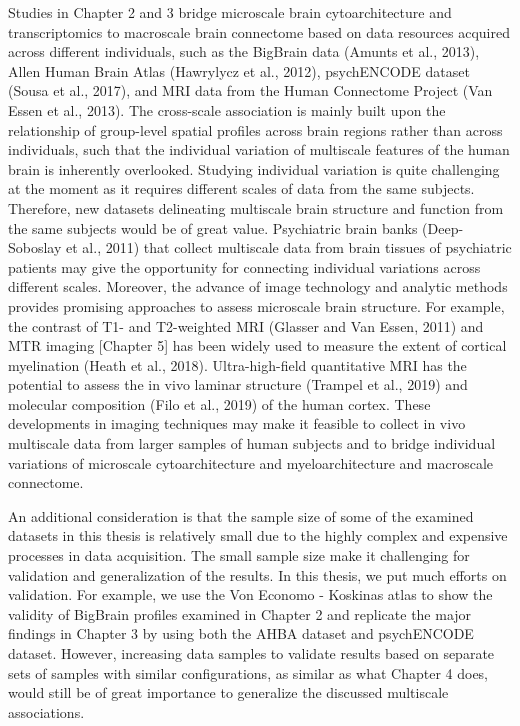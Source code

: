 \begin{refsection}
Studies in Chapter 2 and 3 bridge microscale brain cytoarchitecture and transcriptomics to macroscale brain connectome based on data resources acquired across different individuals, such as the BigBrain data (Amunts et al., 2013), Allen Human Brain Atlas (Hawrylycz et al., 2012), psychENCODE dataset (Sousa et al., 2017), and MRI data from the Human Connectome Project (Van Essen et al., 2013). The cross-scale association is mainly built upon the relationship of group-level spatial profiles across brain regions rather than across individuals, such that the individual variation of multiscale features of the human brain is inherently overlooked. Studying individual variation is quite challenging at the moment as it requires different scales of data from the same subjects. Therefore, new datasets delineating multiscale brain structure and function from the same subjects would be of great value. Psychiatric brain banks (Deep-Soboslay et al., 2011) that collect multiscale data from brain tissues of psychiatric patients may give the opportunity for connecting individual variations across different scales. Moreover, the advance of image technology and analytic methods provides promising approaches to assess microscale brain structure. For example, the contrast of T1- and T2-weighted MRI (Glasser and Van Essen, 2011) and MTR imaging [Chapter 5] has been widely used to measure the extent of cortical myelination (Heath et al., 2018). Ultra-high-field quantitative MRI has the potential to assess the in vivo laminar structure (Trampel et al., 2019) and molecular composition (Filo et al., 2019) of the human cortex. These developments in imaging techniques may make it feasible to collect in vivo multiscale data from larger samples of human subjects and to bridge individual variations of microscale cytoarchitecture and myeloarchitecture and macroscale connectome.

An additional consideration is that the sample size of some of the examined datasets in this thesis is relatively small due to the highly complex and expensive processes in data acquisition. The small sample size make it challenging for validation and generalization of the results. In this thesis, we put much efforts on validation. For example, we use the Von Economo - Koskinas atlas to show the validity of BigBrain profiles examined in Chapter 2 and replicate the major findings in Chapter 3 by using both the AHBA dataset and psychENCODE dataset. However, increasing data samples to validate results based on separate sets of samples with similar configurations, as similar as what Chapter 4 does, would still be of great importance to generalize the discussed multiscale associations.  


\end{refsection}
